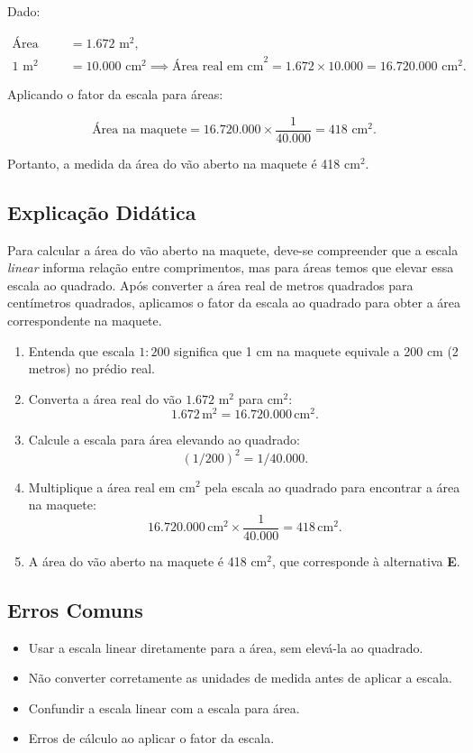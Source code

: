 \documentclass{article}
\begin{document}
Dado:

\begin{align*}
  \text{Área real} &= 1.672 \text{ m}^2, \\
  1 \text{ m}^2 &= 10.000 \text{ cm}^2 \implies \text{Área real em cm}^2 = 1.672 \times 10.000 = 16.720.000 \text{ cm}^2.
\end{align*}

Aplicando o fator da escala para áreas:

\[
  \text{Área na maquete} = 16.720.000 \times \frac{1}{40.000} = 418 \text{ cm}^2.
\]

Portanto, a medida da área do vão aberto na maquete é 418 cm$^{2}$.

\subsection*{Explicação Didática}

Para calcular a área do vão aberto na maquete, deve-se compreender que a escala \emph{linear} informa relação entre comprimentos, mas para áreas temos que elevar essa escala ao quadrado. Após converter a área real de metros quadrados para centímetros quadrados, aplicamos o fator da escala ao quadrado para obter a área correspondente na maquete.

\begin{enumerate}
  \item Entenda que escala $1:200$ significa que 1 cm na maquete equivale a 200 cm (2 metros) no prédio real.
  \item Converta a área real do vão $1.672$ m$^{2}$ para cm$^{2}$:
  \[
    1.672 \,\text{m}^{2} = 16.720.000 \,\text{cm}^{2}.
  \]
  \item Calcule a escala para área elevando ao quadrado:
  \[
    (1/200)^2 = 1/40.000.
  \]
  \item Multiplique a área real em cm$^{2}$ pela escala ao quadrado para encontrar a área na maquete:
  \[
    16.720.000 \,\text{cm}^{2} \times \frac{1}{40.000} = 418 \,\text{cm}^{2}.
  \]
  \item A área do vão aberto na maquete é 418 cm$^{2}$, que corresponde à alternativa \textbf{E}.
\end{enumerate}

\subsection*{Erros Comuns}

\begin{itemize}
  \item Usar a escala linear diretamente para a área, sem elevá-la ao quadrado.
  \item Não converter corretamente as unidades de medida antes de aplicar a escala.
  \item Confundir a escala linear com a escala para área.
  \item Erros de cálculo ao aplicar o fator da escala.
\end{itemize}
\end{document}
